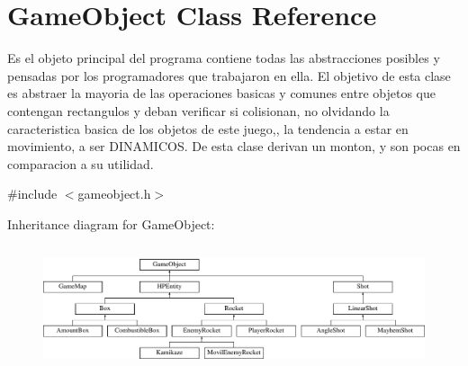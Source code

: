 \hypertarget{class_game_object}{\section{Game\-Object Class Reference}
\label{class_game_object}
}


Es el objeto principal del programa contiene todas las abstracciones posibles y pensadas por los programadores que trabajaron en ella. El objetivo de esta clase es abstraer la mayoria de las operaciones basicas y comunes entre objetos que contengan rectangulos y deban verificar si colisionan, no olvidando la caracteristica basica de los objetos de este juego,, la tendencia a estar en movimiento, a ser D\-I\-N\-A\-M\-I\-C\-O\-S. De esta clase derivan un monton, y son pocas en comparacion a su utilidad.  




{\ttfamily \#include $<$gameobject.\-h$>$}

Inheritance diagram for Game\-Object\-:\begin{figure}[H]
\begin{center}
\leavevmode
\includegraphics[height=3.674541cm]{class_game_object}
\end{center}
\end{figure}
